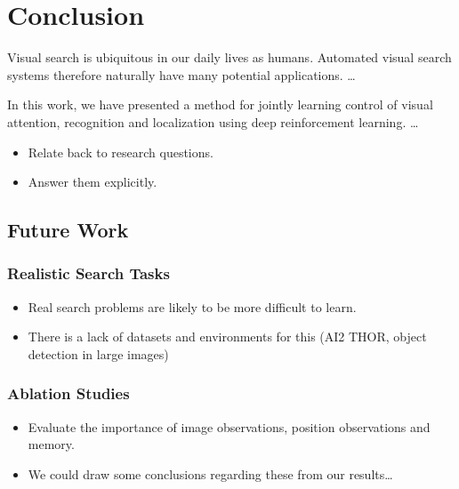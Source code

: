 \chapter{Conclusion}
\label{cha:conclusion}

Visual search is ubiquitous in our daily lives as humans.
Automated visual search systems therefore naturally have many potential applications.
\dots

In this work, we have presented a method for jointly learning control of visual attention, recognition and localization using deep reinforcement learning.
\dots

\begin{itemize}
    \item Relate back to research questions.
    \item Answer them explicitly.
\end{itemize}


\section{Future Work}

\subsection{Realistic Search Tasks}

\begin{itemize}
    \item Real search problems are likely to be more difficult to learn.
    \item There is a lack of datasets and environments for this (AI2 THOR, object detection in large images)
\end{itemize}

\subsection{Ablation Studies}

\begin{itemize}
    \item Evaluate the importance of image observations, position observations and memory.
    \item We could draw some conclusions regarding these from our results\dots
\end{itemize}